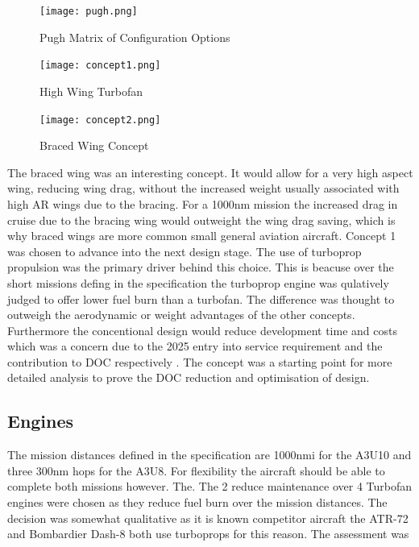 \documentclass[11pt]{article}
\begin{document}
\begin{figure}[!h]
\centering
\texttt{[image: pugh.png]}
\caption{Pugh Matrix of Configuration Options }
\label{fig:pugh}
\end{figure}

\begin{figure}[!h]
\centering
\texttt{[image: concept1.png]}
\caption{High Wing Turbofan }
\label{fig:concept1}
\end{figure}

\begin{figure}[!h]
\centering
\texttt{[image: concept2.png]}
\caption{Braced Wing Concept}
\label{fig:concept2}
\end{figure}


\FloatBarrier

The braced wing was an interesting concept. It would allow for a very high aspect wing, reducing wing drag, without the increased weight usually associated with high AR wings due to the bracing. For a 1000nm mission the increased drag in cruise due to the bracing wing would outweight the wing drag saving, which is why braced wings are more common small general aviation aircraft. Concept 1 was chosen to advance into the next design stage. The use of turboprop propulsion was the primary driver behind this choice. This is beacuse over the short missions defing in the specification the turboprop engine was qulatively judged to offer lower fuel burn than a turbofan. The difference was thought to outweigh the aerodynamic or weight advantages of the other concepts. Furthermore the concentional design would reduce development time and costs which was a concern due to the 2025 entry into service requirement and the contribution to DOC respectively \cite{spec}. The concept was a starting point for more detailed analysis to prove the DOC reduction and optimisation of design. 

\subsection{Engines}

The mission distances defined in the specification are 1000nmi for the A3U10 and three 300nm hops for the A3U8. For flexibility the aircraft should be able to complete both missions however. The. The  2 reduce maintenance over 4 Turbofan engines were chosen as they reduce fuel burn over the mission distances. The decision was somewhat qualitative as it is known competitor aircraft the ATR-72 and Bombardier Dash-8  both use turboprops for this reason. The assessment was  
\end{document}
